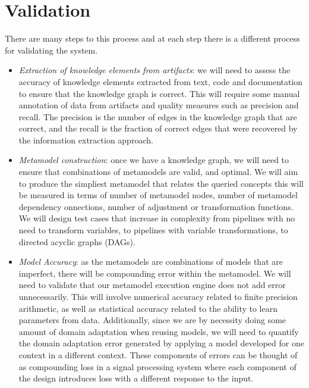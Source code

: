 \documentclass{article}
\begin{document}
\section{Validation}
There are many steps to this process and at each step there is a different process for validating the system.

\begin{itemize}
    \item \emph{Extraction of knowledge elements from artifacts}: we will need to assess the accuracy of knowledge elements extracted from text, code and documentation to ensure that the knowledge graph is correct. This will require some manual annotation of data from artifacts and quality measures such as precision and recall. The precision is the number of edges in the knowledge graph that are correct, and the recall is the fraction of correct edges that were recovered by the information extraction approach.
    
    \item \emph{Metamodel construction}: once we have a knowledge graph, we will need to ensure that combinations of metamodels are valid, and optimal. We will aim to produce the simpliest metamodel that relates the queried concepts this will be measured in terms of number of metamodel nodes, number of metamodel dependency onnections, number of adjustment or transformation functions. We will design test cases that increase in complexity from pipelines with no need to transform variables, to pipelines with variable transformations, to directed acyclic graphs (DAGs).
    
    \item \emph{Model Accuracy}: as the metamodels are combinations of models that are imperfect, there will be compounding error within the metamodel. We will need to validate that our metamodel execution engine does not add error unnecessarily. This will involve numerical accuracy related to finite precision arithmetic, as well as statistical accuracy related to the ability to learn parameters from data. Additionally, since we are by necessity doing some amount of domain adaptation when reusing models, we will need to quantify the domain adaptation error generated by applying a model developed for one context in a different context. These components of errors can be thought of as compounding loss in a signal processing system where each component of the design introduces loss with a different response to the input.
\end{itemize}
\end{document}
